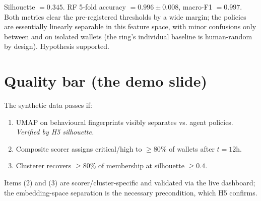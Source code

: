 \documentclass[11pt]{article}
\begin{document}
\begin{result}
Silhouette $= 0.345$. RF 5-fold accuracy $= 0.996 \pm 0.008$, macro-F1
$= 0.997$. Both metrics clear the pre-registered thresholds by a wide margin;
the policies are essentially linearly separable in this feature space, with
minor confusions only between  and 
on isolated wallets (the ring's individual baseline is human-random by
design). Hypothesis supported.
\end{result}

\section{Quality bar (the demo slide)}

The synthetic data passes if:
\begin{enumerate}
  \item UMAP on behavioural fingerprints visibly separates
     vs. agent policies. \emph{Verified by H5
    silhouette.}
  \item Composite scorer assigns critical/high to $\geq 80$\% of
     wallets after $t=12$h.
  \item Clusterer recovers $\geq 80$\% of  membership at
    silhouette $\geq 0.4$.
\end{enumerate}

Items (2) and (3) are scorer/cluster-specific and validated via the live
dashboard; the embedding-space separation is the necessary precondition,
which H5 confirms.
\end{document}
